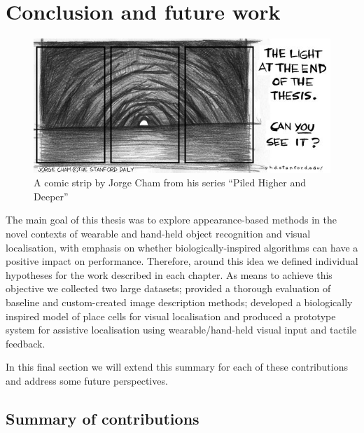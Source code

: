 \chapter{Conclusion and future work}\label{ch:conclusion}

\begin{figure}[h!]
\centering
\includegraphics[width=.8\textwidth]{./gfx/Chapter07/phd051700s.jpg}
\caption{A  comic strip by Jorge Cham from his series ``Piled Higher and Deeper'' \cite{Cham}}
\end{figure}

The main goal of this thesis was to explore appearance-based methods in the novel contexts of wearable and hand-held object recognition and visual localisation, with emphasis on whether biologically-inspired algorithms can have a positive impact on performance. Therefore, around this idea we defined individual hypotheses for the work described in each chapter. As means to achieve this objective we collected two large datasets; provided a thorough evaluation of baseline and custom-created image description methods; developed a biologically inspired model of place cells for visual localisation and produced a prototype system for assistive localisation using wearable/hand-held visual input and tactile feedback.

In this final section we will extend this summary for each of these contributions and address some future perspectives.

\section{Summary of contributions}


